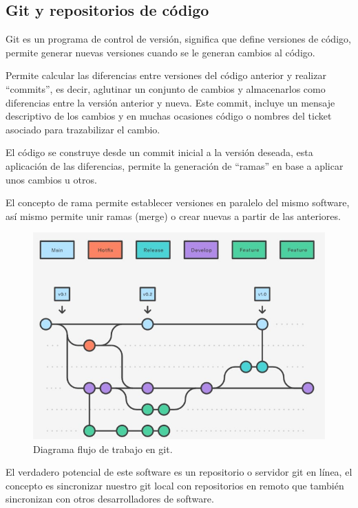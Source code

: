 \subsection{Git y repositorios de código}
Git\cite{c_git} es un programa de control de versión, significa que define versiones de código, permite generar nuevas versiones cuando se le generan cambios al código. 

Permite calcular las diferencias entre versiones del código anterior y realizar “commits”, es decir, aglutinar un conjunto de cambios y almacenarlos como diferencias entre la versión anterior y nueva. Este commit, incluye un mensaje descriptivo de los cambios y en muchas ocasiones código o nombres del ticket asociado para trazabilizar el cambio.

El código se construye desde un commit inicial a la versión deseada, esta aplicación de las diferencias, permite la generación de “ramas” en base a aplicar unos cambios u otros. 

El concepto de rama permite establecer versiones en paralelo del mismo software, así mismo permite unir ramas (merge) o crear nuevas a partir de las anteriores.
\begin{figure}[!htb]
\begin{center}
\includegraphics[width=1\textwidth]{./figuras/git_flow}
\caption{Diagrama flujo de trabajo en git\cite{i_git_flow}.}
\label{F:git_flow}
\end{center}
\end{figure}
 El verdadero potencial de este software es un repositorio o servidor git en línea, el concepto es sincronizar nuestro git local con repositorios en remoto que también sincronizan con otros desarrolladores de software. 
 
